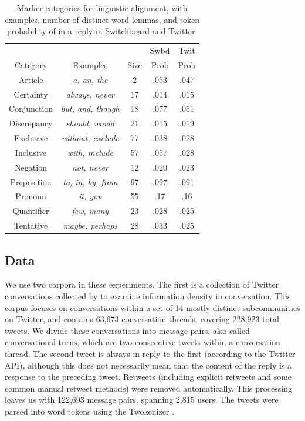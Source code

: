 \documentclass[11pt]{article}
\begin{document}
\begin{table}
\centering
\small
\begin{tabular}{|c|c|c|c|c|} \hline
& & & Swbd & Twit \\
Category & Examples & Size & Prob & Prob\\ \hline
Article & \textit{a, an, the} & 2 & .053 & .047\\
Certainty  & \textit{always, never} & 17 & .014 & .015\\
Conjunction  & \textit{but, and, though} & 18 & .077 & .051\\
Discrepancy  & \textit{should, would} & 21 & .015 & .019\\
Exclusive  & \textit{without, exclude} & 77 & .038 & .028\\
Inclusive  & \textit{with, include} & 57 & .057 & .028\\
Negation  & \textit{not, never} & 12 & .020 & .023\\
Preposition  & \textit{to, in, by, from} & 97 & .097 & .091\\
Pronoun   & \textit{it, you} & 55 & .17 & .16\\
Quantifier  & \textit{few, many} & 23 & .028 & .025\\
Tentative & \textit{maybe, perhaps} & 28 & .033 & .025\\
\hline\end{tabular}
\caption{Marker categories for linguistic alignment, with examples, number of distinct word lemmas, and token probability of in a reply in Switchboard and Twitter.}\label{tab:LIWC}
\end{table}

\subsection{Data}
We use two corpora in these experiments. The first is a collection of Twitter conversations collected by \cite{DoyleFrank2015CMCL} to examine information density in conversation. This corpus focuses on conversations within a set of 14 mostly distinct subcommunities on Twitter, and contains 63,673 conversation threads, covering 228,923 total tweets.  We divide these conversations into message pairs, also called conversational turns, which are two consecutive tweets within a conversation thread.  The second tweet is always in reply to the first (according to the Twitter API), although this does not necessarily mean that the content of the reply is a response to the preceding tweet. Retweets (including explicit retweets and some common manual retweet methods) were removed automatically. This processing leaves us with 122,693 message pairs, spanning 2,815 users.  The tweets were parsed into word tokens using the Twokenizer \cite{OwoputiEtAl2013}.
\end{document}
